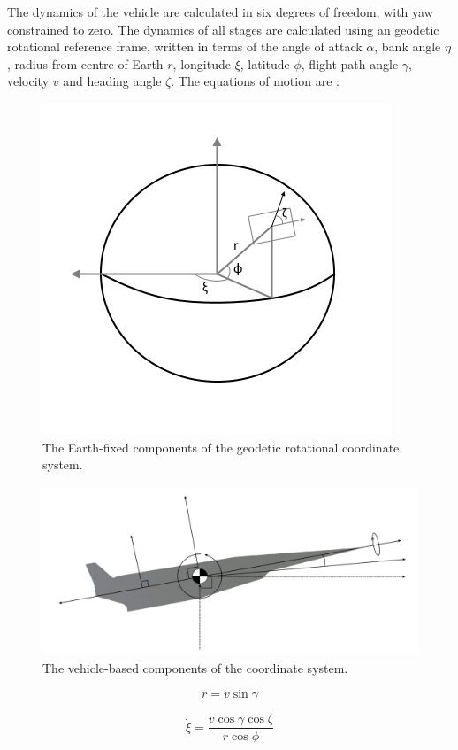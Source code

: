 The dynamics of the vehicle are calculated in six degrees of freedom, with yaw constrained to zero. 
The dynamics of all stages are calculated using an geodetic rotational reference frame, written in terms of the angle of attack $\alpha$, bank angle $\eta$, radius from centre of Earth $r$, longitude $\xi$, latitude $\phi$, flight path angle $\gamma$, velocity $v$ and heading angle $\zeta$. The equations of motion are \cite{Josselyn2002a}:
\begin{figure}[ht]
\centering
\includegraphics[width=0.7\linewidth]{figures/4_LODESTAR/global}
\caption{The Earth-fixed components of the geodetic rotational coordinate system.}
\label{fig:global}
\end{figure}
\begin{figure}[ht]
\centering
\includegraphics[width=0.9\linewidth]{figures/4_LODESTAR/Axes}
\caption{The vehicle-based components of the coordinate system.}
\label{fig:Axes}
\end{figure}


\begin{equation}
\dot{r} = v \sin \gamma
\end{equation}

\begin{equation}
\dot{\xi} = \frac{v\cos \gamma \cos \zeta}{r \cos \phi}
\end{equation}

